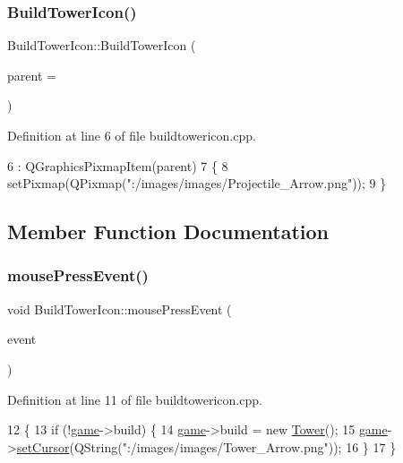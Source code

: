 \subsubsection{\texorpdfstring{Build\+Tower\+Icon()}{BuildTowerIcon()}}
{\footnotesize\ttfamily Build\+Tower\+Icon\+::\+Build\+Tower\+Icon (\begin{DoxyParamCaption}\item[{Q\+Graphics\+Item $\ast$}]{parent = {} }\end{DoxyParamCaption})}



Definition at line 6 of file buildtowericon.\+cpp.


\begin{DoxyCode}
6                                                    : QGraphicsPixmapItem(parent)
7 \{
8     setPixmap(QPixmap(\textcolor{stringliteral}{":/images/images/Projectile\_Arrow.png"}));
9 \}
\end{DoxyCode}


\subsection{Member Function Documentation}
\mbox{\label{class_build_tower_icon_a4232a6267dd0b252eb4bd58b36becc11}} 
\subsubsection{\texorpdfstring{mouse\+Press\+Event()}{mousePressEvent()}}
{\footnotesize\ttfamily void Build\+Tower\+Icon\+::mouse\+Press\+Event (\begin{DoxyParamCaption}\item[{Q\+Graphics\+Scene\+Mouse\+Event $\ast$}]{event }\end{DoxyParamCaption})}



Definition at line 11 of file buildtowericon.\+cpp.


\begin{DoxyCode}
12 \{
13     \textcolor{keywordflow}{if} (!\hyperlink{buildtowericon_8cpp_a58bdb5643d0814ac4e697a1564b79b70}{game}->build) \{
14         \hyperlink{buildtowericon_8cpp_a58bdb5643d0814ac4e697a1564b79b70}{game}->build = \textcolor{keyword}{new} \hyperlink{class_tower}{Tower}();
15         \hyperlink{buildtowericon_8cpp_a58bdb5643d0814ac4e697a1564b79b70}{game}->\hyperlink{class_game_a7272e282812b8af0be83044db196dc6c}{setCursor}(QString(\textcolor{stringliteral}{":/images/images/Tower\_Arrow.png"}));
16     \}
17 \}
\end{DoxyCode}


